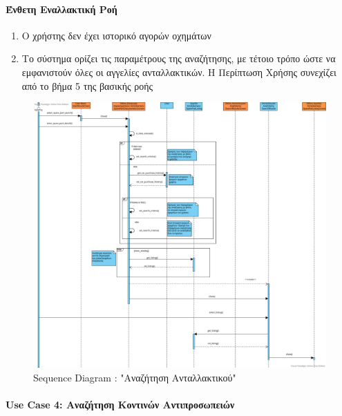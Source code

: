 \documentclass{../ol-softwaremanual}
\begin{document}
	\paragraph{Ένθετη Εναλλακτική Ροή}
	\begin{enumerate}
		\item Ο χρήστης δεν έχει ιστορικό αγορών οχημάτων
		\item Το σύστημα ορίζει τις παραμέτρους της αναζήτησης, με τέτοιο τρόπο ώστε να εμφανιστούν όλες οι αγγελίες ανταλλακτικών. Η Περίπτωση Χρήσης συνεχίζει από το βήμα 5 της βασικής ροής
	\end{enumerate}
	
	\newpage
	
	\begin{figure}[htbp!]
		\centering	
		\includegraphics[scale=0.3]{img/seq_spare_part_search.png}
		\caption{\en Sequence Diagram : "\gr Αναζήτηση Ανταλλακτικού\en"\gr}
	\end{figure}
	
	\newpage
	
	\centering
	\paragraph{\en Use Case 4: \gr Αναζήτηση Κοντινών Αντιπροσωπειών}	
	
\end{document}
